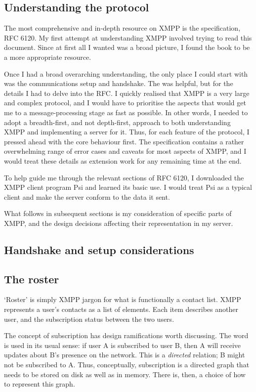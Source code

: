 \documentclass[12pt,a4paper,twoside,openright]{report}
\begin{document}
{\subsection{Understanding the protocol}
The most comprehensive and in-depth resource on XMPP is the specification, RFC 6120. My first attempt at understanding XMPP involved trying to read this document. Since at first all I wanted was a broad picture, I found the book  to be a more appropriate resource.

Once I had a broad overarching understanding, the only place I could start with was the communications setup and handshake. The  was helpful, but for the details I had to delve into the RFC. I quickly realised that XMPP is a very large and complex protocol, and I would have to prioritise the aspects that would get me to a message-processing stage as fast as possible. In other words, I needed to adopt a breadth-first, and not depth-first, approach to both understanding XMPP and implementing a server for it. Thus, for each feature of the protocol, I pressed ahead with the core behaviour first. The specification contains a rather overwhelming range of error cases and caveats for most aspects of XMPP, and I would treat these details as extension work for any remaining time at the end.

To help guide me through the relevant sections of RFC 6120, I downloaded the XMPP client program Psi\cite{Psi-IM} and learned its basic use. I would treat Psi as a typical client and make the server conform to the data it sent.

What follows in subsequent sections is my consideration of specific parts of XMPP, and the design decisions affecting their representation in my server.

\subsection{Handshake and setup considerations}

\subsection{The roster}
`Roster' is simply XMPP jargon for what is functionally a contact list. XMPP represents a user's contacts as a list of  elements. Each item describes another user, and the subscription status between the two users.

The concept of subscription has design ramifications worth discussing. The word is used in its usual sense: if user A is subscribed to user B, then A will receive updates about B's presence on the network. This is a \emph{directed} relation; B might not be subscribed to A. Thus, conceptually, subscription is a directed graph that needs to be stored on disk as well as in memory. There is, then, a choice of how to represent this graph.

}
\end{document}
